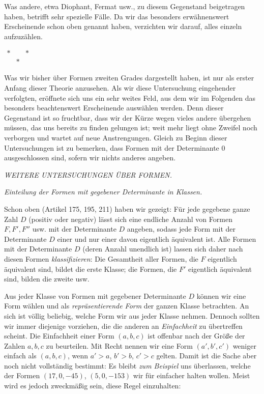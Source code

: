 Was andere, etwa Diophant, Fermat usw., zu diesem Gegenstand beigetragen haben, betrifft sehr spezielle Fälle. Da wir das besonders erwähnenswert Erscheinende schon oben genannt haben, verzichten wir darauf, alles einzeln aufzuzählen.

\begin{center}
$\begin{array}{ccc}\ast&&\ast\\&\ast&\end{array}$
\end{center}

Was wir bisher über Formen zweiten Grades dargestellt haben, ist nur als erster Anfang dieser Theorie anzusehen. Als wir diese Untersuchung eingehender verfolgten, eröffnete sich uns ein sehr weites Feld, aus dem wir im Folgenden das besonders beachtenswert Erscheinende auswählen werden. Denn dieser Gegenstand ist so fruchtbar, dass wir der Kürze wegen vieles andere übergehen müssen, das uns bereits zu finden gelungen ist; weit mehr liegt ohne Zweifel noch verborgen und wartet auf neue Anstrengungen. Gleich zu Beginn dieser Untersuchungen ist zu bemerken, dass Formen mit der Determinante $0$ ausgeschlossen sind, sofern wir nichts anderes angeben.

\begin{center}
\textit{WEITERE UNTERSUCHUNGEN ÜBER FORMEN.}
\end{center}

\begin{center}
\textit{Einteilung der Formen mit gegebener Determinante in Klassen.}
\end{center}

Schon oben (Artikel 175, 195, 211) haben wir gezeigt: Für jede gegebene ganze Zahl $D$ (positiv oder negativ) lässt sich eine endliche Anzahl von Formen $F,F',F''$ usw. mit der Determinante $D$ angeben, sodass jede Form mit der Determinante $D$ einer und nur einer davon eigentlich äquivalent ist. Alle Formen mit der Determinante $D$ (deren Anzahl unendlich ist) lassen sich daher nach diesen Formen \textit{klassifizieren}: Die Gesamtheit aller Formen, die $F$ eigentlich äquivalent sind, bildet die erste Klasse; die Formen, die $F'$ eigentlich äquivalent sind, bilden die zweite usw.

Aus jeder Klasse von Formen mit gegebener Determinante $D$ können wir eine Form wählen und als \textit{repräsentierende Form} der ganzen Klasse betrachten. An sich ist völlig beliebig, welche Form wir aus jeder Klasse nehmen. Dennoch sollten wir immer diejenige vorziehen, die die anderen an \textit{Einfachheit} zu übertreffen scheint. Die Einfachheit einer Form $(a,b,c)$ ist offenbar nach der Größe der Zahlen $a,b,c$ zu beurteilen. Mit Recht nennen wir eine Form $(a',b',c')$ weniger einfach als $(a,b,c)$, wenn $a'>a$, $b'>b$, $c'>c$ gelten. Damit ist die Sache aber noch nicht vollständig bestimmt: Es bleibt \textit{zum Beispiel} uns überlassen, welche der Formen $(17,0,-45)$, $(5,0,-153)$ wir für einfacher halten wollen. Meist wird es jedoch zweckmäßig sein, diese Regel einzuhalten:

